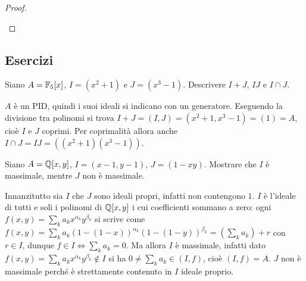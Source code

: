 \begin{proof}
\begin{itemize}
    \end{itemize}
\end{proof}

\subsection{Esercizi}

\begin{exercise}
    Siano $A = \mathbb{F}_5[x]$, $I = (x^2 + 1)$ e $J = (x^3 - 1)$. Descrivere $I + J$, $IJ$ e $I \cap J$.
\end{exercise}
\begin{solution}
    $A$ è un PID, quindi i suoi ideali si indicano con un generatore. Eseguendo la divisione tra polinomi si trova $I + J = (I, J) = (x^2 + 1, x^3 - 1) = (1) = A$, cioè $I$ e $J$ coprimi. Per coprimalità allora anche $I \cap J = IJ = ((x^2+1)(x^3-1))$.
\end{solution}

\begin{exercise}
    Siano $A = \mathbb{Q}[x, y]$, $I = (x-1, y-1)$, $J = (1 - xy)$. Mostrare che $I$ è massimale, mentre $J$ non è massimale.
\end{exercise}
\begin{solution}
    Innanzitutto sia $I$ che $J$ sono ideali propri, infatti non contengono $1$. $I$ è l'ideale di tutti e soli i polinomi di $\mathbb{Q}[x, y]$ i cui coefficienti sommano a zero: ogni $f(x, y) = \sum_k {a_k x^{\alpha_k}y^{\beta_k}}$ si scrive come $f(x, y) = \sum_k {a_k (1 - (1 - x))^{\alpha_k}(1 - (1 - y))^{\beta_k}} = (\sum_k a_k) + r$ con $r \in I$, dunque $f \in I \iff \sum_k a_k = 0$. Ma allora $I$ è massimale, infatti dato $f(x, y) = \sum_k {a_k x^{\alpha_k}y^{\beta_k}} \notin I$ si ha $0 \neq \sum_k a_k \in (I, f)$, cioè $(I, f) = A$. $J$ non è massimale perché è strettamente contenuto in $I$ ideale proprio.
\end{solution}

